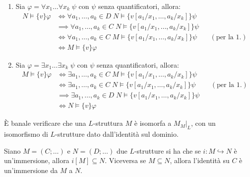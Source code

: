 \begin{soln}
\begin{enumerate}
\begin{itemize}
\begin{align*}
            \end{align*}
        \end{itemize}
        \item Sia $\varphi = \forall x_1 \ldots \forall x_k \; \psi$ con $\psi$ senza quantificatori, allora:
        \begin{align*}
            N \models \{v\} \varphi &\iff \forall a_1, \ldots, a_k \in D \; N \models \{v[a_1/x_1, \ldots, a_k/x_k]\} \psi \\
                                    &\implies \forall a_1, \ldots, a_k \in C \; N \models \{v[a_1/x_1, \ldots, a_k/x_k]\} \psi \\
                                    &\iff \forall a_1, \ldots, a_k \in C \; M \models \{v[a_1/x_1, \ldots, a_k/x_k]\} \psi &&(\text{per la 1.}) \\
                                    &\iff M \models \{v\} \varphi
        \end{align*}
        \item Sia $\varphi = \exists x_1 \ldots \exists x_k \; \psi$ con $\psi$ senza quantificatori, allora:
        \begin{align*}
            M \models \{v\} \varphi &\iff \exists a_1, \ldots, a_k \in C \; M \models \{v[a_1/x_1, \ldots, a_k/x_k]\} \psi \\
                                    &\iff \exists a_1, \ldots, a_k \in C \; N \models \{v[a_1/x_1, \ldots, a_k/x_k]\} \psi &&(\text{per la 1.}) \\
                                    &\implies \exists a_1, \ldots, a_k \in D \; N \models \{v[a_1/x_1, \ldots, a_k/x_k]\} \psi \\
                                    &\iff N \models \{v\} \varphi
        \end{align*}
    \end{enumerate}
\end{soln}

\begin{remark}
    È banale verificare che una $L$-struttura $M$ è isomorfa a $M_M|_L$, con un isomorfismo di $L$-strutture dato dall'identità sul dominio.
\end{remark}

\begin{remark}
    Siano $M = (C;\ldots)$ e $N = (D;\ldots)$ due $L$-strutture si ha che se $i : M \hookrightarrow N$ è un'immersione, allora $i[M] \subseteq N$. Viceversa se $M \subseteq N$, allora l'identità su $C$ è un'immersione da $M$ a $N$.
\end{remark}

